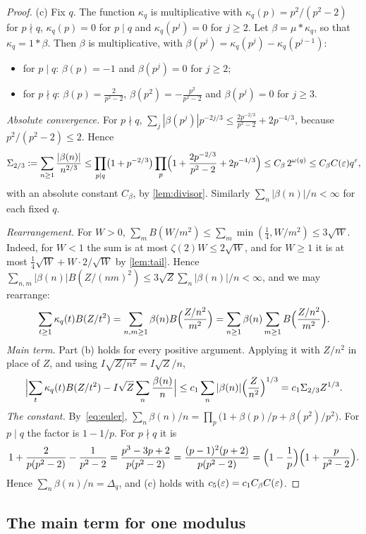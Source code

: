 \begin{proof}
(c) Fix $q$. The function $\kappa_q$ is multiplicative with $\kappa_q(p)=p^2/(p^2-2)$ for $p\nmid q$, $\kappa_q(p)=0$ for $p\mid q$ and $\kappa_q(p^j)=0$ for $j\ge2$. Let $\beta=\mu*\kappa_q$, so that $\kappa_q=1*\beta$. Then $\beta$ is multiplicative, with $\beta(p^j)=\kappa_q(p^j)-\kappa_q(p^{j-1})$:
\begin{itemize}
\item for $p\mid q$: $\beta(p)=-1$ and $\beta(p^j)=0$ for $j\ge2$;
\item for $p\nmid q$: $\beta(p)=\frac2{p^2-2}$, $\beta(p^2)=-\frac{p^2}{p^2-2}$ and $\beta(p^j)=0$ for $j\ge3$.
\end{itemize}
\emph{Absolute convergence.} For $p\nmid q$, $\sum_j|\beta(p^j)|p^{-2j/3}\le\frac{2p^{-2/3}}{p^2-2}+2p^{-4/3}$, because $p^2/(p^2-2)\le2$. Hence
\[
\Sigma_{2/3}:=\sum_{n\ge1}\frac{|\beta(n)|}{n^{2/3}}\le\prod_{p\mid q}\bigl(1+p^{-2/3}\bigr)\prod_p\Bigl(1+\frac{2p^{-2/3}}{p^2-2}+2p^{-4/3}\Bigr)\le C_\beta\,2^{\omega(q)}\le C_\beta C(\varepsilon)q^\varepsilon,
\]
with an absolute constant $C_\beta$, by \cref{lem:divisor}. Similarly $\sum_n|\beta(n)|/n<\infty$ for each fixed $q$.

\emph{Rearrangement.} For $W>0$, $\sum_mB(W/m^2)\le\sum_m\min(\frac14,W/m^2)\le3\sqrt W$. Indeed, for $W<1$ the sum is at most $\zeta(2)W\le2\sqrt W$, and for $W\ge1$ it is at most $\frac14\sqrt W+W\cdot2/\sqrt W$ by \cref{lem:tail}. Hence $\sum_{n,m}|\beta(n)|B(Z/(nm)^2)\le3\sqrt Z\sum_n|\beta(n)|/n<\infty$, and we may rearrange:
\[
\sum_{t\ge1}\kappa_q(t)B(Z/t^2)=\sum_{n,m\ge1}\beta(n)B\Bigl(\frac{Z/n^2}{m^2}\Bigr)=\sum_{n\ge1}\beta(n)\sum_{m\ge1}B\Bigl(\frac{Z/n^2}{m^2}\Bigr).
\]
\emph{Main term.} Part (b) holds for every positive argument. Applying it with $Z/n^2$ in place of $Z$, and using $I\sqrt{Z/n^2}=I\sqrt Z/n$,
\[
\Bigl|\sum_t\kappa_q(t)B(Z/t^2)-I\sqrt Z\sum_n\frac{\beta(n)}n\Bigr|\le c_1\sum_n|\beta(n)|\Bigl(\frac Z{n^2}\Bigr)^{1/3}=c_1\Sigma_{2/3}Z^{1/3}.
\]
\emph{The constant.} By~\eqref{eq:euler}, $\sum_n\beta(n)/n=\prod_p\bigl(1+\beta(p)/p+\beta(p^2)/p^2\bigr)$. For $p\mid q$ the factor is $1-1/p$. For $p\nmid q$ it is
\[
1+\frac2{p(p^2-2)}-\frac1{p^2-2}=\frac{p^3-3p+2}{p(p^2-2)}=\frac{(p-1)^2(p+2)}{p(p^2-2)}=\Bigl(1-\frac1p\Bigr)\Bigl(1+\frac p{p^2-2}\Bigr).
\]
Hence $\sum_n\beta(n)/n=\Delta_q$, and (c) holds with $c_5(\varepsilon)=c_1C_\beta C(\varepsilon)$.
\end{proof}

\subsection{The main term for one modulus}

